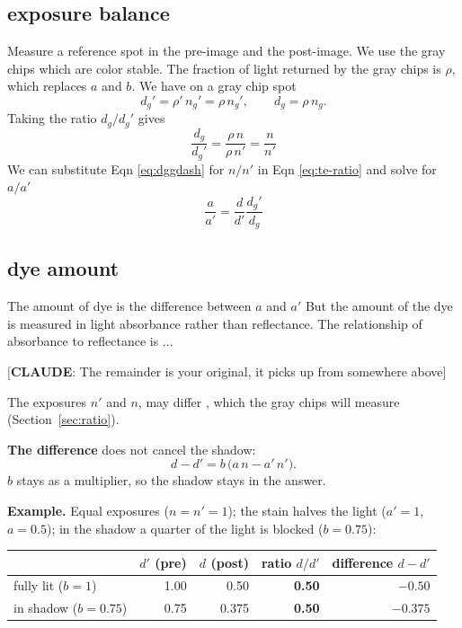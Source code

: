 \documentclass[11pt,letter]{article}
\newcommand{\ToClaude}[1]{[\textbf{CLAUDE}: {#1}]}
\begin{document}
\subsection{exposure balance}

Measure a reference spot in the pre-image and the post-image.
We use the gray chips which are color stable.
The fraction of light returned by the gray chips is $\rho$, which replaces $a$ and $b$. 
We have on a gray chip spot
\begin{equation}
	d_g' = \rho'\, n_g' = \rho\, n_g', \qquad d_g = \rho \, n_g .
\end{equation}
Taking the ratio $d_g / d_g'$ gives
\begin{equation}
	\frac{d_g}{d_g'} = \frac{\rho \, n}{\rho \, n'} = \frac{n}{n'}
	\label{eq:dggdash}
\end{equation}
We can substitute Eqn \ref{eq:dggdash} for $n / n'$ in Eqn \ref{eq:te-ratio}
and solve for $a / a'$
\begin{equation}
	\frac{a}{a'} = \frac{d}{d'} \frac{d_g'}{d_g}
\end{equation}

\subsection{dye amount}

The amount of dye is the difference between $a$ and $a'$
But the amount of the dye is measured in light absorbance rather than reflectance.
The relationship of absorbance to reflectance is ...

\ToClaude{The remainder is your original, it picks up from somewhere above} 

The exposures $n'$ and $n$,  may differ
, which the gray chips
will measure (Section~\ref{sec:ratio}).

\noindent\textbf{The difference} does not cancel the shadow:
\begin{equation}
  d - d' = b\,\bigl(a\, n - a'\, n'\bigr).
  \label{eq:te-diff}
\end{equation}
$b$ stays as a multiplier, so the shadow stays in the answer.

\noindent\textbf{Example.}  Equal exposures ($n = n' = 1$); the stain
halves the light ($a' = 1$, $a = 0.5$); in the shadow a quarter of the
light is blocked ($b = 0.75$):

\medskip
\begin{center}
\begin{tabular}{@{}lrrrr@{}}
\toprule
 & $d'$ (pre) & $d$ (post) & ratio $d/d'$ & difference $d - d'$ \\
\midrule
fully lit ($b = 1$)    & 1.00 & 0.50  & \textbf{0.50} & $-0.50$ \\
in shadow ($b = 0.75$) & 0.75 & 0.375 & \textbf{0.50} & $-0.375$ \\
\bottomrule
\end{tabular}
\end{center}
\end{document}
